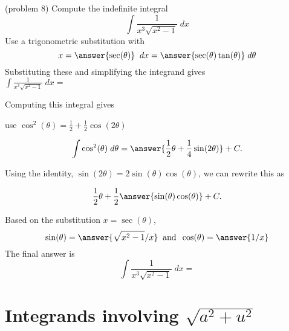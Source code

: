 \documentclass{ximera}
\begin{document}
\begin{problem}(problem 8)
Compute the indefinite integral
\[
\int \frac{1}{x^3\sqrt{x^2-1}} \; dx
\]
Use a trigonometric substitution with\\
\[
x = \answer{\sec(\theta)} \;\; dx = \answer{ \sec(\theta)\tan(\theta)} \; d\theta
\]
Substituting these and simplifying the integrand gives\\
$\displaystyle{\int  \frac{1}{x^3\sqrt{x^2-1}}\; dx =}$\\
\begin{multipleChoice}
\end{multipleChoice}

Computing this integral gives
\begin{hint}
use $\cos^2(\theta) = \frac12 + \frac12 \cos(2\theta)$
\end{hint}

\[
\int \cos^2(\theta) \; d\theta = \answer{\frac12 \theta + \frac14 \sin(2\theta) } + C.
\]

Using the identity, $\sin(2\theta) = 2\sin(\theta)\cos(\theta)$, we can rewrite this as

\[
\frac12 \theta + \frac12 \answer{\sin(\theta) \cos(\theta)} + C.
\]

Based on the substitution $x = \sec(\theta)$, \\
\[
\sin(\theta) = \answer{\sqrt{x^2 -1}/x} \;\; \text{and} \;\; \cos(\theta) = \answer{1/x}
\]
The final answer is
\[
\int   \frac{1}{x^3\sqrt{x^2-1}} \; dx = 
\]

\begin{center}
\begin{multipleChoice}
\end{multipleChoice}
\end{center}


\end{problem}





\section{Integrands involving $\sqrt{a^2 + u^2}$}
\end{document}
